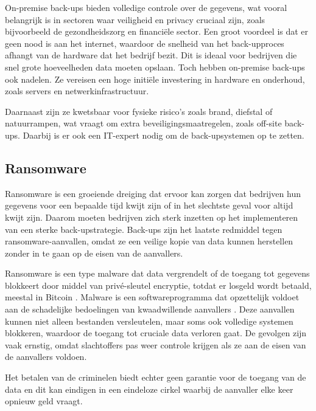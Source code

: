 On-premise back-ups bieden volledige controle over de gegevens, wat vooral belangrijk is in sectoren waar veiligheid en privacy cruciaal zijn, zoals bijvoorbeeld de gezondheidszorg en financiële sector. Een groot voordeel is dat er geen nood is aan het internet, waardoor de snelheid van het back-upproces afhangt van de hardware dat het bedrijf bezit. Dit is ideaal voor bedrijven die snel grote hoeveelheden data moeten opslaan. Toch hebben on-premise back-ups ook nadelen. Ze vereisen een hoge initiële investering in hardware en onderhoud, zoals servers en netwerkinfrastructuur. 

Daarnaast zijn ze kwetsbaar voor fysieke risico’s zoals brand, diefstal of natuurrampen, wat vraagt om extra beveiligingsmaatregelen, zoals off-site back-ups. Daarbij is er ook een IT-expert nodig om de back-upsystemen op te zetten.

\subsection{Ransomware}
Ransomware is een groeiende dreiging dat ervoor kan zorgen dat bedrijven hun gegevens voor een bepaalde tijd kwijt zijn of in het slechtste geval voor altijd kwijt zijn. Daarom moeten bedrijven zich sterk inzetten op het implementeren van een sterke back-upstrategie. Back-ups zijn het laatste redmiddel tegen ransomware-aanvallen, omdat ze een veilige kopie van data kunnen herstellen zonder in te gaan op de eisen van de aanvallers. 

Ransomware is een type malware dat data vergrendelt of de toegang tot gegevens blokkeert door middel van privé-sleutel encryptie, totdat er losgeld wordt betaald, meestal in Bitcoin \autocite{Richardson2017}. Malware is een softwareprogramma dat opzettelijk voldoet aan de schadelijke bedoelingen van kwaadwillende aanvallers \autocite{Yanfang2017}. Deze aanvallen kunnen niet alleen bestanden versleutelen, maar soms ook volledige systemen blokkeren, waardoor de toegang tot cruciale data verloren gaat. De gevolgen zijn vaak ernstig, omdat slachtoffers pas weer controle krijgen als ze aan de eisen van de aanvallers voldoen. 

Het betalen van de criminelen biedt echter geen garantie voor de toegang van de data en dit kan eindigen in een eindeloze cirkel waarbij de aanvaller elke keer opnieuw geld vraagt.

